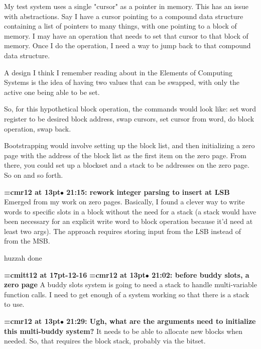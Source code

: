 My test system uses a single "cursor" as a pointer in memory. This has an issue with abstractions. Say I have a cursor pointing to a compound data structure containing a list of pointers to many things, with one pointing to a block of memory. I may have an operation that needs to set that cursor to that block of memory. Once I do the operation, I need a way to jump back to that compound data structure.
\par

A design I think I remember reading about in the Elements of Computing Systems is the idea of having two values that can be swapped, with only the active one being able to be set.
\par

So, for this hypothetical block operation, the commands would look like: set word register to be desired block address, swap cursors, set cursor from word, do block operation, swap back.
\par

Bootstrapping would involve setting up the block list, and then initializing a zero page with the address of the block list as the first item on the zero page. From there, you could set up a blockset and a stack to be addresses on the zero page. So on and so forth.
\par

{\smallskip\noindent\bf\font\titlefont=cmr12 at 13pt\titlefont $\bullet$ 21:15: rework integer parsing to insert at LSB}\smallskip
Emerged from my work on zero pages. Basically, I found a clever way to write words to specific slots in a block without the need for a stack (a stack would have been necessary for an explicit write word to block operation because it'd need at least two args). The approach requires storing input from the LSB instead of from the MSB.
\par

huzzah done
\par

{\medskip\noindent\bf\font\titlefont=cmitt12 at 17pt-12-16}\medskip
{\smallskip\noindent\bf\font\titlefont=cmr12 at 13pt\titlefont $\bullet$ 21:02: before buddy slots, a zero page}\smallskip
A buddy slots system is going to need a stack to handle multi-variable function calls. I need to get enough of a system working so that there is a stack to use.
\par

{\smallskip\noindent\bf\font\titlefont=cmr12 at 13pt\titlefont $\bullet$ 21:29: Ugh, what are the arguments need to initialize this multi-buddy system?}\smallskip
It needs to be able to allocate new blocks when needed. So, that requires the block stack, probably via the bitset.
\par

